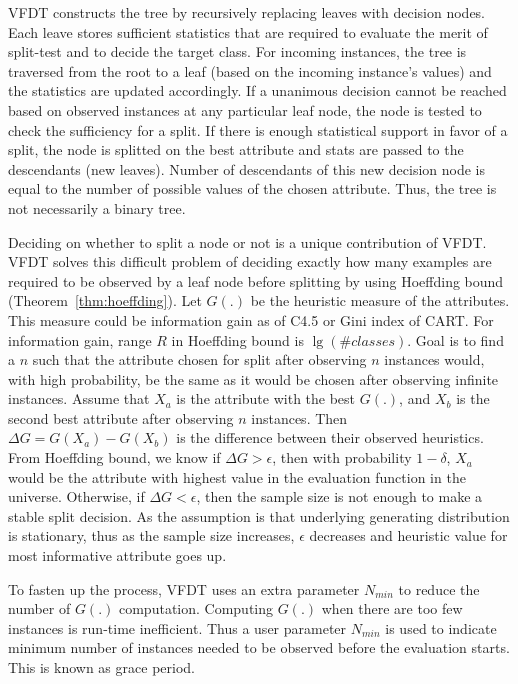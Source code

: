 VFDT constructs the tree by recursively replacing leaves with decision nodes. Each leave stores sufficient statistics that are required to evaluate the merit of split-test and to decide the target class. For incoming instances, the tree is traversed from the root to a leaf (based on the incoming instance's values) and the statistics are updated accordingly. If a unanimous decision cannot be reached based on observed instances at any particular leaf node, the node is tested to check the sufficiency for a split. If there is enough statistical support in favor of a split, the node is splitted on the best attribute and stats are passed to the descendants (new leaves). Number of descendants of this new decision node is equal to the number of possible values of the chosen attribute. Thus, the tree is not necessarily a binary tree.

Deciding on whether to split a node or not is a unique contribution of VFDT. VFDT solves this difficult problem of deciding exactly how many examples are required to be observed by a leaf node before splitting by using Hoeffding bound (Theorem~\ref{thm:hoeffding}). Let $G(.)$ be the heuristic measure of the attributes. This measure could be information gain as of C4.5 or Gini index of CART. For information gain, range $R$ in Hoeffding bound is $\lg (\#classes)$. Goal is to find a $n$ such that the attribute chosen for split after observing $n$ instances would, with high probability, be the same as it would be chosen after observing infinite instances. Assume that $X_a$ is the attribute with the best $G(.)$, and $X_b$ is the second best attribute after observing $n$ instances. Then $\Delta G = G(X_a) - G(X_b)$ is the difference between their observed heuristics. From Hoeffding bound, we know if $\Delta G > \epsilon$, then with probability $1 - \delta$, $X_a$ would be the attribute with highest value in the evaluation function in the universe. Otherwise, if $\Delta G < \epsilon$, then the sample size is not enough to make a stable split decision. As the assumption is that underlying generating distribution is stationary, thus as the sample size increases, $\epsilon$ decreases and heuristic value for most informative attribute goes up.

To fasten up the process, VFDT uses an extra parameter $N_{min}$ to reduce the number of $G(.)$ computation. Computing $G(.)$ when there are too few instances is run-time inefficient. Thus a user parameter $N_{min}$ is used to indicate minimum number of instances needed to be observed before the evaluation starts. This is known as grace period.

